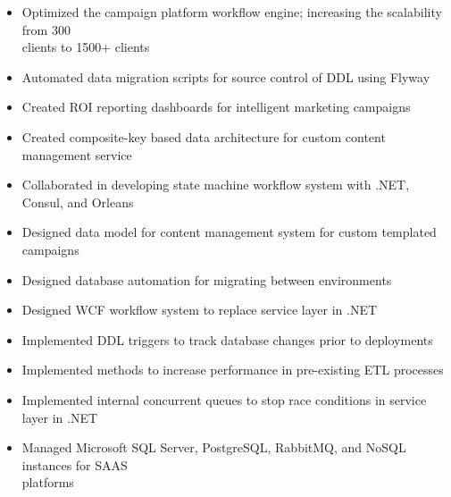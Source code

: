 
\ProjectExperienceExpandedTwoSectionCont
{\begin{itemize}
   \item Optimized the campaign platform workflow engine; increasing the scalability from 300
    \\clients to 1500+ clients
    \item Automated data migration scripts for source control of DDL using Flyway
    \item Created ROI reporting dashboards for intelligent marketing campaigns
    \item Created composite-key based data architecture for custom content management service
\end{itemize}}
{\begin{itemize}
    \item Collaborated in developing state machine workflow system with .NET, Consul, and Orleans
    \item Designed data model for content management system for custom templated campaigns
    \item Designed database automation for migrating between environments
    \item Designed WCF workflow system to replace service layer in .NET
\end{itemize}}
{\begin{itemize}
    \item Implemented DDL triggers to track database changes prior to deployments
    \item Implemented methods to increase performance in pre-existing ETL processes
    \item Implemented internal concurrent queues to stop race conditions in service layer in .NET
    \item Managed Microsoft SQL Server, PostgreSQL, RabbitMQ, and NoSQL instances for SAAS
    \\platforms
\end{itemize}}

\vspace*{0.05 in}

